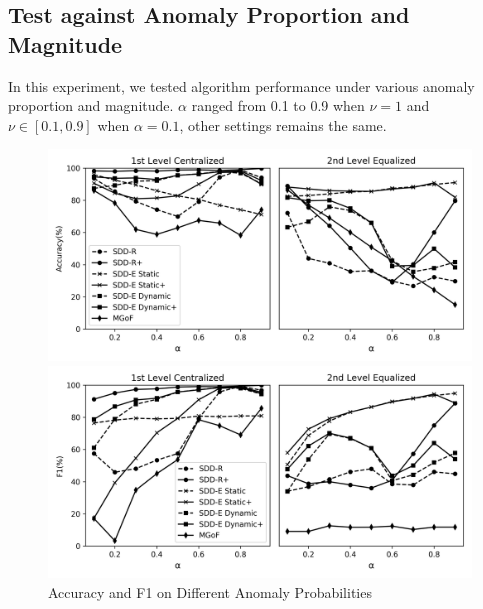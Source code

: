 \documentclass{article}
\begin{document}
		\subsection{Test against Anomaly Proportion and Magnitude}\label{sec:exp-synthetic}
			In this experiment, we tested algorithm performance under various anomaly proportion and magnitude. $\alpha$ ranged from 0.1 to 0.9 when $\nu = 1$ and $\nu \in [0.1, 0.9]$ when $\alpha = 0.1$, other settings remains the same.
			
			\begin{figure}[!t]
				\includegraphics[width=\linewidth]{fig/AccuracyOnAnomalyProbability.png}
				
				\includegraphics[width=\linewidth]{fig/F1OnAnomalyProbability.png}
				\caption{Accuracy and F1 on Different Anomaly Probabilities}
				\label{fig:anomaly-probability}
			\end{figure}
	
\end{document}
